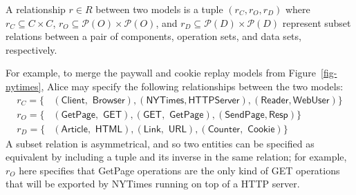 \begin{defn} A relationship $r \in R$ between two models is a tuple
  $(r_{C}, r_{O}, r_{D})$ where $r_{C} \subseteq C \times C$, $r_{O}
  \subseteq \mathcal P (O) \times \mathcal P (O)$, and $r_{D}
  \subseteq \mathcal P (D) \times \mathcal P (D)$ represent subset
  relations between a pair of components, operation sets, and data
  sets, respectively.
\end{defn}
For example, to merge the paywall and cookie replay models from
Figure~\ref{fig-nytimes}, Alice may specify the following
relationships between the two models:
\begin{align*}
  r_{C} = \{&(\textsf{Client$,$ Browser}),(\textsf{NYTimes$,$
    HTTPServer}), (\textsf{Reader$,$
    WebUser})\} \\
  r_{O} = \{&(\textsf{GetPage$,$ GET}), (\textsf{GET$,$ GetPage}),
  (\textsf{SendPage$,$
    Resp})\}\\
  r_{D} = \{&(\textsf{Article$,$ HTML}),(\textsf{Link$,$ URL}),
  (\textsf{Counter$,$ Cookie})\}
\end{align*}
A subset relation is asymmetrical, and so two entities can be
specified as equivalent by including a tuple and its inverse in the
same relation; for example, $r_{O}$ here specifies that
\textsf{GetPage} operations are the only kind of \textsf{GET}
operations that will be exported by \textsf{NYTimes} running on top of
a HTTP server.


